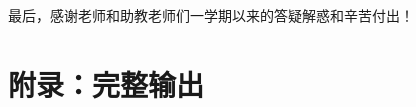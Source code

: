 \documentclass[a4paper,twoside]{article}
\begin{document}
\begin{spacing}{1.2}
最后，感谢老师和助教老师们一学期以来的答疑解惑和辛苦付出！

\clearpage
\appendix
\section{附录：完整输出}
\label{sec:fullout}

\inputminted{bnf}{text/generate.txt}


\end{spacing}
\end{document}
